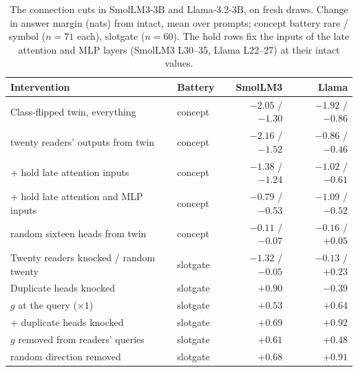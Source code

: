 \documentclass{article}
\begin{document}
\begin{table}[t]
\centering\small
\caption{The connection cuts in SmolLM3-3B and Llama-3.2-3B, on fresh draws. Change in answer margin (nats) from intact, mean over prompts; concept battery rare / symbol ($n=71$ each), slotgate ($n=60$). The hold rows fix the inputs of the late attention and MLP layers (SmolLM3 L30--35, Llama L22--27) at their intact values.}\label{tab:arrows_rep}
\begin{tabular}{llrr}
\toprule
Intervention & Battery & SmolLM3 & Llama \\
\midrule
Class-flipped twin, everything & concept & $-2.05$ / $-1.30$ & $-1.92$ / $-0.86$ \\
\quad twenty readers' outputs from twin & concept & $-2.16$ / $-1.52$ & $-0.86$ / $-0.46$ \\
\quad\quad + hold late attention inputs & concept & $-1.38$ / $-1.24$ & $-1.02$ / $-0.61$ \\
\quad\quad + hold late attention and MLP inputs & concept & $-0.79$ / $-0.53$ & $-1.09$ / $-0.52$ \\
\quad random sixteen heads from twin & concept & $-0.11$ / $-0.07$ & $-0.16$ / $+0.05$ \\
\midrule
Twenty readers knocked / random twenty & slotgate & $-1.32$ / $-0.05$ & $-0.13$ / $+0.23$ \\
Duplicate heads knocked & slotgate & $+0.90$ & $-0.39$ \\
$g$ at the query ($\times 1$) & slotgate & $+0.53$ & $+0.64$ \\
\quad + duplicate heads knocked & slotgate & $+0.69$ & $+0.92$ \\
\quad\quad $g$ removed from readers' queries & slotgate & $+0.61$ & $+0.48$ \\
\quad\quad random direction removed & slotgate & $+0.68$ & $+0.91$ \\
\bottomrule
\end{tabular}
\end{table}
\end{document}
